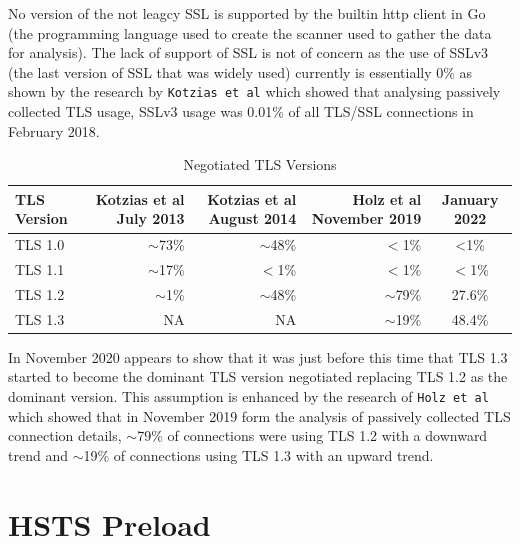 \documentclass{mscreport}
\begin{document}
\noindent
No version of the not leagcy SSL is supported by the builtin http client in Go (the programming language used to create the scanner used to gather the data for analysis). The lack of support of SSL is not of concern as the use of SSLv3 (the last version of SSL that was widely used) currently is essentially 0\% as shown by the research by \texttt{Kotzias et al} \cite{Kotzias2018-wd} which showed that analysing passively collected TLS usage, SSLv3 usage was 0.01\% of all TLS/SSL connections in February 2018.

\begin{table}[H]
\footnotesize
  \begin{center}
    \begin{tabular}{|l|D|D|D|c|}  %
      \hline
      \textbf{TLS Version} & \textbf{Kotzias et al} \cite{Kotzias2018-wd} July 2013 & \textbf{Kotzias et al} \cite{Kotzias2018-wd} August 2014 & \textbf{Holz et al} \cite{Holz2020-ha} November 2019 & January 2022 \\
      \hline
	  TLS 1.0 & $\sim$73\% & $\sim$48\% & $<$1\% & <1\%\\
	  \hline
	  TLS 1.1 & $\sim$17\% & $<$1\% & $<$1\% & $<$1\%\\
	  \hline
	  TLS 1.2 & $\sim$1\% & $\sim$48\% & $\sim$79\% & 27.6\%\\
	  \hline
	  TLS 1.3 & NA & NA & $\sim$19\% & 48.4\%\\
	  \hline
    \end{tabular}
    \caption{Negotiated TLS Versions}
    \label{table:tls_negotiated} %
  \end{center}
\end{table}

\noindent
In November 2020 appears to show that it was just before this time that TLS 1.3 started to become the dominant TLS version negotiated replacing TLS 1.2 as the dominant version. This assumption is enhanced by the research of \texttt{Holz et al} \cite{Holz2020-ha} which showed that in November 2019 form the analysis of passively collected TLS connection details, $\sim$79\% of connections were using TLS 1.2 with a downward trend and $\sim$19\% of connections using TLS 1.3 with an upward trend.


\newpage


\section{HSTS Preload}
\label{section:hsts_preload}
\end{document}
